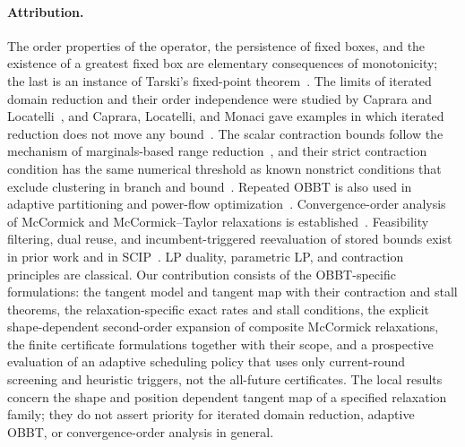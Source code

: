 \paragraph{Attribution.} The order properties of the operator, the
persistence of fixed boxes, and the existence of a greatest fixed box are
elementary consequences of monotonicity; the last is an instance of
Tarski's fixed-point theorem~\cite{tarski1955fixpoint}. The limits of
iterated domain reduction and their order independence were studied by
Caprara and
Locatelli~\cite{caprara2010-global-optimization-problems-and-domain}, and
Caprara, Locatelli, and Monaci gave examples in which iterated reduction
does not move any
bound~\cite{caprara2016-theoretical-and-computational-results-about}. The
scalar contraction bounds follow the mechanism of marginals-based range
reduction~\cite{ryoo1995-global-optimization-of-nonconvex-nlps}, and their
strict contraction condition has the same numerical threshold as known
nonstrict conditions that exclude clustering in branch and
bound~\cite{wechsung2014-the-cluster-problem-revisited,kannan2017-the-cluster-problem-in-constrained}.
Repeated OBBT is also used in adaptive partitioning and power-flow
optimization~\cite{nagarajan2019-an-adaptive-multivariate-partitioning-algorithm,sundar2023-optimization-based-bound-tightening-using}.
Convergence-order analysis of McCormick and McCormick--Taylor relaxations is
established~\cite{bompadre2012-convergence-rate-of-mccormick-relaxations,najman2016-convergence-analysis-of-multivariate-mccormick-relaxations,bompadre2013-convergence-analysis-of-taylor-models}.
Feasibility filtering, dual reuse, and incumbent-triggered reevaluation of
stored bounds exist in prior work and in
SCIP~\cite{gleixner2017-three-enhancements-for-optimization-based,scip2026obbt}.
LP duality, parametric LP, and contraction principles are classical. Our
contribution consists of the OBBT-specific formulations: the tangent model
and tangent map with their contraction and stall theorems, the
relaxation-specific exact rates and stall conditions, the explicit
shape-dependent second-order expansion of composite McCormick relaxations,
the finite certificate formulations together with their scope, and a
prospective evaluation of an adaptive scheduling policy that uses only
current-round screening and heuristic triggers, not the all-future
certificates. The local results concern the
shape and position dependent tangent map of a specified relaxation family;
they do not assert priority for iterated domain reduction, adaptive OBBT,
or convergence-order analysis in general.

